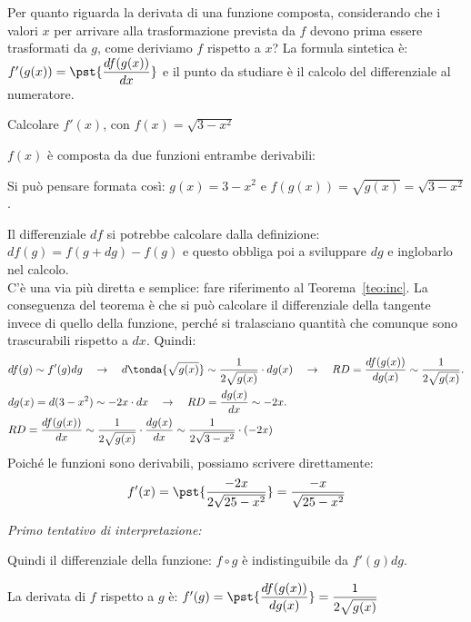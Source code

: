 \vspace{1em}
Per quanto riguarda la derivata di una funzione composta, 
considerando che i valori \(x\) per arrivare alla trasformazione prevista 
da \(f\) devono prima essere trasformati da \(g\), come deriviamo  \(f\) 
rispetto a \(x\)? La formula sintetica è: 
\(f'(g(x))=\pst{\dfrac{df(g(x))}{dx}}\) e il punto da studiare è il calcolo 
del differenziale al numeratore.

\begin{esempio}
Calcolare \(f'(x)\), con \(f(x)=\sqrt{3-x^2}\)

\(f(x)\) è composta da due funzioni entrambe derivabili: 

Si può pensare formata così: 
\(g(x)=3-x^2\) \quad e \quad \(f(g(x))=\sqrt{g(x)}=\sqrt{3-x^2}\).

\begin{center} \scalebox{1}{\boxfcompostab} \end{center}
\label{gra:differenziazione_boxcompostaa}

Il differenziale \(df\) si potrebbe calcolare dalla definizione: 
\(df(g)=f(g+dg)-f(g)\) e questo obbliga poi a sviluppare \(dg\) e 
inglobarlo nel calcolo. \\
C'è una via più diretta e semplice: fare riferimento al 
Teorema~\ref{teo:inc}.
La conseguenza del teorema è che si può calcolare il differenziale della 
tangente invece di quello della funzione, perché si tralasciano quantità 
che comunque sono trascurabili rispetto a \(dx\). 
Quindi:
\begin{align*}
&df(g)\sim f'(g)dg \quad \rightarrow\quad 
d\tonda{\sqrt{g(x)}} \sim \frac{1}{2 \sqrt{g(x)}} \cdot dg(x)
\quad \rightarrow\quad 
RD=\dfrac{df(g(x))}{dg(x)}\sim\dfrac{1}{2\sqrt{g(x)}}.\\
&dg(x)=d(3-x^2)\sim-2x\cdot dx\quad \rightarrow\quad RD= \dfrac{dg(x)}{dx}
\sim-2x.\\
&RD=\dfrac{df(g(x))}{dx}\sim\dfrac{1}{2\sqrt{g(x)}}\cdot \dfrac{dg(x)}{dx}
\sim \frac{1}{2\sqrt{3-x^2}}\cdot (-2x)
\end{align*}
Poiché le funzioni sono derivabili, possiamo scrivere direttamente:
\[f'(x)=\pst{\dfrac{-2x}{2\sqrt{25-x^2}}} = \dfrac{-x}{\sqrt{25-x^2}}\]

\emph{Primo tentativo di interpretazione:}

Quindi il differenziale della funzione: \(f \circ g\) 
è indistinguibile da \(f'(g)dg\). 

La derivata di \(f\) rispetto a \(g\) è: 
\(f'(g) = \pst{\dfrac{df(g(x))}{dg(x)}} = \dfrac{1}{2\sqrt{g(x)}}\)


\end{esempio}
